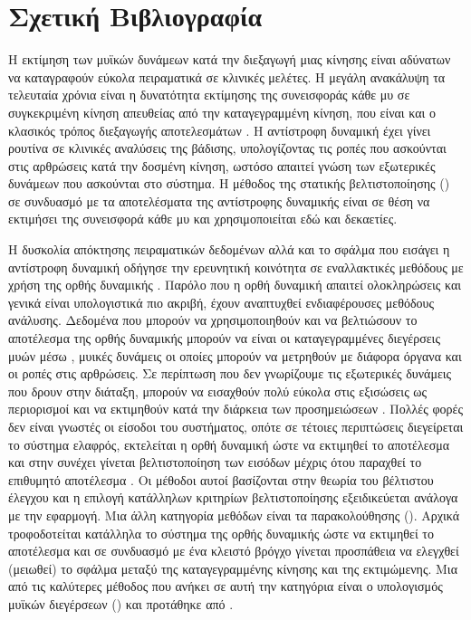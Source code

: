 \section{Σχετική Βιβλιογραφία}

Η εκτίμηση των μυϊκών δυνάμεων κατά την διεξαγωγή μιας κίνησης είναι αδύνατων να καταγραφούν εύκολα πειραματικά σε κλινικές μελέτες. Η μεγάλη ανακάλυψη τα τελευταία χρόνια είναι η δυνατότητα εκτίμησης της συνεισφοράς κάθε μυ σε συγκεκριμένη κίνηση απευθείας από την καταγεγραμμένη κίνηση, που είναι και ο κλασικός τρόπος διεξαγωγής αποτελεσμάτων \cite{hamner10, mclean03}. Η αντίστροφη δυναμική έχει γίνει ρουτίνα σε κλινικές αναλύσεις της βάδισης, υπολογίζοντας τις ροπές που ασκούνται στις αρθρώσεις κατά την δοσμένη κίνηση, ωστόσο απαιτεί γνώση των εξωτερικές δυνάμεων που ασκούνται στο σύστημα. Η μέθοδος της στατικής βελτιστοποίησης () σε συνδυασμό με τα αποτελέσματα της αντίστροφης δυναμικής είναι σε θέση να εκτιμήσει της συνεισφορά κάθε μυ \cite{heintz06, erdemir07} και χρησιμοποιείται εδώ και δεκαετίες.

Η δυσκολία απόκτησης πειραματικών δεδομένων αλλά και το σφάλμα που εισάγει η αντίστροφη δυναμική οδήγησε την ερευνητική κοινότητα σε εναλλακτικές μεθόδους με χρήση της ορθής δυναμικής \cite{buchanan04}. Παρόλο που η ορθή δυναμική απαιτεί ολοκληρώσεις και γενικά είναι υπολογιστικά πιο ακριβή, έχουν αναπτυχθεί ενδιαφέρουσες μεθόδους ανάλυσης. Δεδομένα που μπορούν να χρησιμοποιηθούν και να βελτιώσουν το αποτέλεσμα της ορθής δυναμικής μπορούν να είναι οι καταγεγραμμένες διεγέρσεις μυών μέσω , μυικές δυνάμεις οι οποίες μπορούν να μετρηθούν με διάφορα όργανα και οι ροπές στις αρθρώσεις. Σε περίπτωση που δεν γνωρίζουμε τις εξωτερικές δυνάμεις που δρουν στην διάταξη, μπορούν να εισαχθούν πολύ εύκολα στις εξισώσεις ως περιορισμοί και να εκτιμηθούν κατά την διάρκεια των προσημειώσεων \cite{hamner10, seitha11}. Πολλές φορές δεν είναι γνωστές οι είσοδοι του συστήματος, οπότε σε τέτοιες περιπτώσεις διεγείρεται το σύστημα ελαφρός, εκτελείται η ορθή δυναμική ώστε να εκτιμηθεί το αποτέλεσμα και στην συνέχει γίνεται βελτιστοποίηση των εισόδων μέχρις ότου παραχθεί το επιθυμητό αποτέλεσμα \cite{pandy01}. Οι μέθοδοι αυτοί βασίζονται στην θεωρία του βέλτιστου έλεγχου και η επιλογή κατάλληλων κριτηρίων βελτιστοποίησης εξειδικεύεται ανάλογα με την εφαρμογή. Μια άλλη κατηγορία μεθόδων είναι τα παρακολούθησης (). Αρχικά τροφοδοτείται κατάλληλα το σύστημα της ορθής δυναμικής ώστε να εκτιμηθεί το αποτέλεσμα και σε συνδυασμό με ένα κλειστό βρόγχο γίνεται προσπάθεια να ελεγχθεί (μειωθεί) το σφάλμα μεταξύ της καταγεγραμμένης κίνησης και της εκτιμώμενης. Μια από τις καλύτερες μέθοδος που ανήκει σε αυτή την κατηγόρια είναι ο υπολογισμός μυϊκών διεγέρσεων () και προτάθηκε από \cite{thelen06}.

